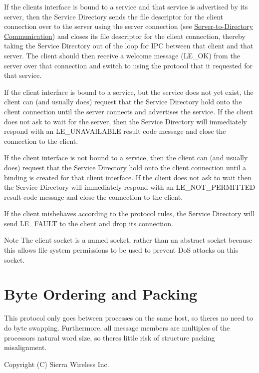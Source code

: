 If the client\textquotesingle{}s interface is bound to a service and that service is advertised by its server, then the Service Directory sends the file descriptor for the client connection over to the server using the server connection (see \hyperlink{serviceDirectoryProtocol_serviceDirectoryProtocol_Servers}{Server-\/to-\/\+Directory Communication}) and closes its file descriptor for the client connection, thereby taking the Service Directory out of the loop for I\+PC between that client and that server. The client should then receive a welcome message (L\+E\+\_\+\+OK) from the server over that connection and switch to using the protocol that it requested for that service.

If the client interface is bound to a service, but the service does not yet exist, the client can (and usually does) request that the Service Directory hold onto the client connection until the server connects and advertises the service. If the client does not ask to wait for the server, then the Service Directory will immediately respond with an L\+E\+\_\+\+U\+N\+A\+V\+A\+I\+L\+A\+B\+LE result code message and close the connection to the client.

If the client interface is not bound to a service, then the client can (and usually does) request that the Service Directory hold onto the client connection until a binding is created for that client interface. If the client does not ask to wait then the Service Directory will immediately respond with an L\+E\+\_\+\+N\+O\+T\+\_\+\+P\+E\+R\+M\+I\+T\+T\+ED result code message and close the connection to the client.

If the client misbehaves according to the protocol rules, the Service Directory will send L\+E\+\_\+\+F\+A\+U\+LT to the client and drop its connection.

\begin{DoxyNote}{Note}
The client socket is a named socket, rather than an abstract socket because this allows file system permissions to be used to prevent DoS attacks on this socket.
\end{DoxyNote}
\hypertarget{serviceDirectoryProtocol_serviceDirectoryProtocol_Packing}{}\section{Byte Ordering and Packing}\label{serviceDirectoryProtocol_serviceDirectoryProtocol_Packing}
This protocol only goes between processes on the same host, so there\textquotesingle{}s no need to do byte swapping. Furthermore, all message members are multiples of the processor\textquotesingle{}s natural word size, so there\textquotesingle{}s little risk of structure packing misalignment.

Copyright (C) Sierra Wireless Inc. 
